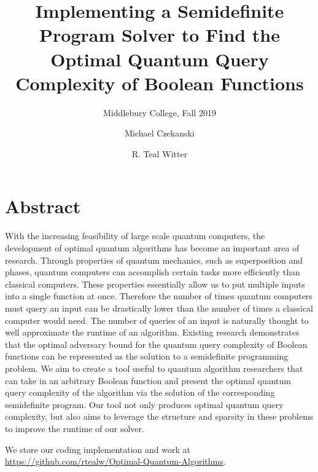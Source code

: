 \documentclass[acmtog]{acmart}
\begin{document}
\title{Implementing a Semidefinite Program Solver to 
Find the Optimal Quantum Query Complexity
of Boolean Functions}

\subtitle{Middlebury College, Fall 2019}

\author{Michael Czekanski}

\author{R. Teal Witter}

\maketitle

\graphicspath{{./../figures/}}
\section*{Abstract}

With the increasing feasibility of large scale quantum computers, the
development of optimal quantum algorithms has become
an important area of research.
Through properties of quantum mechanics, such as
superposition and phases, quantum computers can
accomplish certain tasks more efficiently than
classical computers. These properties essentially
allow us to put multiple inputs into a single function
at once. Therefore the number of times quantum
computers must query an input can be drastically
lower than the number of times a classical computer
would need. The number of queries of an input is
naturally thought to well approximate the runtime of
an algorithm. Existing research demonstrates that the
optimal adversary bound for the quantum query
complexity of Boolean functions can be represented as
the solution to a semidefinite programming problem.
We aim to create a tool useful to quantum algorithm
researchers that can take in an arbitrary Boolean
function and present the optimal quantum query
complexity of the algorithm via the solution of the
corresponding semidefinite program. Our tool not only produces 
optimal quantum query complexity, but also aims to leverage 
the structure and sparsity in these problems to improve the runtime of our solver.


We store our coding implementation and work at
\url{https://github.com/rtealw/Optimal-Quantum-Algorithms}.










\end{document}

